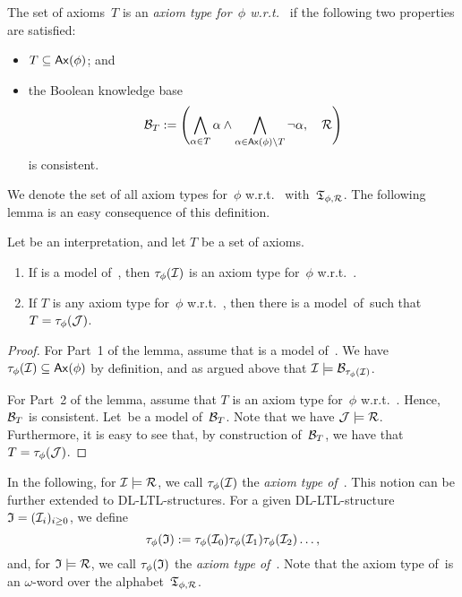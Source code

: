 \begin{definition}
    The set of axioms~$T$ is an \emph{axiom type for~$\phi$ w.r.t.~\Rmc} if the
    following two properties are satisfied:
    \begin{itemize}
        \item $T\subseteq\operatorname{\mathsf{Ax}}(\phi)$; and
        \item the Boolean knowledge base
            \[\Bmc_T:=\Biggl(\bigwedge_{\alpha\in T}\alpha\land%
                \bigwedge_{\alpha\in\Ax(\phi)\setminus T}\lnot\alpha,\quad\Rmc\Biggr)\]
            is consistent.
    \end{itemize}
\end{definition}

\noindent
We denote the set of all axiom types for~$\phi$ w.r.t.~\Rmc
with~$\mathfrak{T}_{\phi,\mathcal{R}}$.
%
The following lemma is an easy consequence of this definition.

\begin{lemma}\label{lem:interpretation-axiom-type}
    Let \Imc be an interpretation, and let $T$ be a set of axioms.
    \begin{enumerate}
        \item If \Imc is a model of~\Rmc, then $\tau_\phi(\mathcal{I})$ is an axiom
            type for~$\phi$ w.r.t.~\Rmc.
        \item If $T$ is any axiom type for~$\phi$ w.r.t.~\Rmc, then there is a
            model~\Jmc of~\Rmc such that $T=\tau_\phi(\mathcal{J})$.
    \end{enumerate}
\end{lemma}

\begin{proof}
    For Part~1 of the lemma, assume that \Imc is a model of~\Rmc.  We have
    $\tau_\phi(\mathcal{I})\subseteq\operatorname{\mathsf{Ax}}(\phi)$ by definition, and as argued above that
    $\mathcal{I}\models\mathcal{B}_{\tau_\phi(\mathcal{I})}$.

    For Part~2 of the lemma, assume that $T$ is an axiom type for~$\phi$
    w.r.t.~\Rmc.  Hence, $\mathcal{B}_T$ is consistent.  Let~\Jmc be a model
    of~$\mathcal{B}_T$.  Note that we have $\mathcal{J}\models\mathcal{R}$.  Furthermore, it is easy
    to see that, by construction of~$\mathcal{B}_T$, we have that $T=\tau_\phi(\mathcal{J})$.
\end{proof}

\noindent
In the following, for $\mathcal{I}\models\mathcal{R}$, we call $\tau_\phi(\mathcal{I})$ the
\emph{axiom type of~\Imc}.  This notion can be further extended to
DL-LTL-structures.  For a given DL-LTL-structure $\mathfrak{I}=(\mathcal{I}_i)_{i\ge 0}$, we
define
\[\tau_\phi(\mathfrak{I}):=\tau_\phi(\mathcal{I}_0)\tau_\phi(\mathcal{I}_1)\tau_\phi(\mathcal{I}_2)\dots,\]
and, for $\mathfrak{I}\models\mathcal{R}$, we call $\tau_\phi(\mathfrak{I})$ the \emph{axiom type
of~\Imf}.  Note that the axiom type of~\Imf is an $\omega$-word over the
alphabet~$\mathfrak{T}_{\phi,\mathcal{R}}$.

